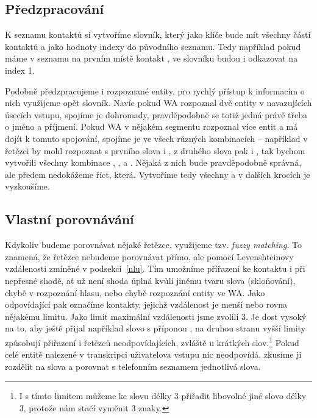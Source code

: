 \subsection{Předzpracování}

K seznamu kontaktů si vytvoříme slovník,
který jako klíče bude mít všechny části kontaktů a jako hodnoty indexy do původního
seznamu. Tedy například pokud máme v seznamu na prvním místě kontakt ,
ve slovníku budou  i  odkazovat na index 1.

Podobně předzpracujeme i rozpoznané entity, pro rychlý přístup k informacím o nich
využijeme opět slovník. Navíc pokud WA rozpoznal dvě entity v navazujících úsecích vstupu,
spojíme je dohromady, pravděpodobně se totiž jedná právě třeba o jméno a příjmení.
Pokud WA v nějakém segmentu rozpoznal více entit a má dojít k tomuto spojování, spojíme
je ve všech různých kombinacích -- například v řetězci  by mohl
rozpoznat s prvního slova  i , z druhého slova pak  i
, tak bychom vytvořili všechny kombinace , ,
 a . Nějaká z nich bude pravděpodobně správná, ale
předem nedokážeme říct, která. Vytvoříme tedy všechny a v dalších krocích
je vyzkoušíme.

\subsection{Vlastní porovnávání}

Kdykoliv budeme porovnávat nějaké řetězce, využijeme tzv. \textit{fuzzy matching}.
To znamená, že řetězce nebudeme porovnávat přímo, ale pomocí Levenshteinovy vzdálenosti
zmíněné v podsekci~\ref{nlu}. Tím umožníme přiřazení ke kontaktu i při nepřesné shodě,
ať už není shoda úplná kvůli jinému tvaru slova (skloňování), chybě v rozpoznání
hlasu, nebo chybě rozpoznání entity ve WA. Jako odpovídající pak označíme kontakty,
jejichž vzdálenost je menší nebo rovna nějakému limitu. Jako limit maximální vzdálenosti
jsme zvolili 3. Je dost vysoký na to, aby ještě přijal například slovo s příponou
, na druhou stranu vyšší limity způsobují přiřazení i řetězců neodpovídajících,
zvláště u krátkých slov.\footnote{I s tímto limitem můžeme ke slovu délky 3 přiřadit libovolné jiné
    slovo délky 3, protože nám stačí vyměnit 3 znaky.} Pokud celé entitě nalezené
v transkripci uživatelova vstupu nic neodpovídá,
zkusíme ji rozdělit na slova a porovnat s telefonním seznamem jednotlivá slova.

